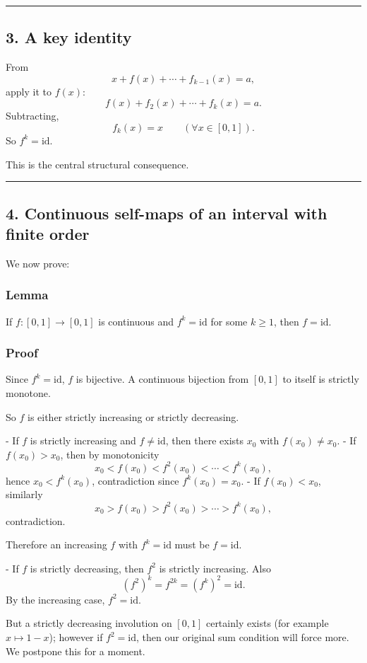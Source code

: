 \documentclass[12pt,a4paper]{article}
\begin{document}
\medskip\hrule\medskip


\subsection*{3. A key identity}

From
\[
x+f(x)+\cdots+f_{k-1}(x)=a,
\]
apply it to \(f(x)\):
\[
f(x)+f_2(x)+\cdots+f_k(x)=a.
\]
Subtracting,
\[
f_k(x)=x \qquad (\forall x\in[0,1]).
\]
So \(f^k=\mathrm{id}\).

This is the central structural consequence.


\medskip\hrule\medskip


\subsection*{4. Continuous self-maps of an interval with finite order}

We now prove:

\subsubsection*{Lemma}
If \(f:[0,1]\to[0,1]\) is continuous and \(f^k=\mathrm{id}\) for some \(k\ge1\), then \(f=\mathrm{id}\).

\subsubsection*{Proof}
Since \(f^k=\mathrm{id}\), \(f\) is bijective. A continuous bijection from \([0,1]\) to itself is strictly monotone.

So \(f\) is either strictly increasing or strictly decreasing.

- If \(f\) is strictly increasing and \(f\neq \mathrm{id}\), then there exists \(x_0\) with \(f(x_0)\neq x_0\).
  - If \(f(x_0)>x_0\), then by monotonicity
    \[
    x_0<f(x_0)<f^2(x_0)<\cdots<f^k(x_0),
    \]
    hence \(x_0<f^k(x_0)\), contradiction since \(f^k(x_0)=x_0\).
  - If \(f(x_0)<x_0\), similarly
    \[
    x_0>f(x_0)>f^2(x_0)>\cdots>f^k(x_0),
    \]
    contradiction.

  Therefore an increasing \(f\) with \(f^k=\mathrm{id}\) must be \(f=\mathrm{id}\).

- If \(f\) is strictly decreasing, then \(f^2\) is strictly increasing. Also
  \[
  (f^2)^k=f^{2k}=(f^k)^2=\mathrm{id}.
  \]
  By the increasing case, \(f^2=\mathrm{id}\).

  But a strictly decreasing involution on \([0,1]\) certainly exists (for example \(x\mapsto 1-x\)); however if \(f^2=\mathrm{id}\), then our original sum condition will force more. We postpone this for a moment.
\end{document}
